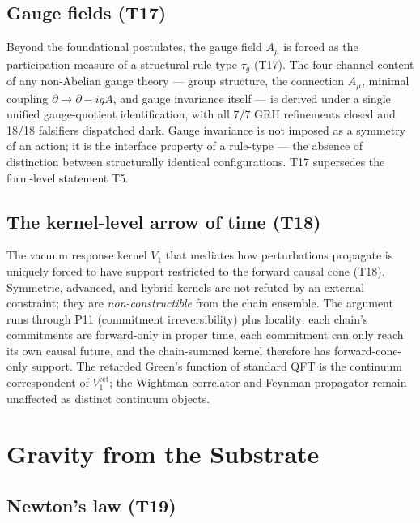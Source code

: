 \documentclass[11pt,a4paper]{article}
\begin{document}
\subsection{Gauge fields (T17)}

Beyond the foundational postulates, the gauge field $A_\mu$ is forced as the participation measure of a structural rule-type $\tau_g$ (T17). The four-channel content of any non-Abelian gauge theory --- group structure, the connection $A_\mu$, minimal coupling $\partial \to \partial - igA$, and gauge invariance itself --- is derived under a single unified gauge-quotient identification, with all 7/7 GRH refinements closed and 18/18 falsifiers dispatched dark. Gauge invariance is not imposed as a symmetry of an action; it is the interface property of a rule-type --- the absence of distinction between structurally identical configurations. T17 supersedes the form-level statement T5.

\subsection{The kernel-level arrow of time (T18)}

The vacuum response kernel $V_1$ that mediates how perturbations propagate is uniquely forced to have support restricted to the forward causal cone (T18). Symmetric, advanced, and hybrid kernels are not refuted by an external constraint; they are \emph{non-constructible} from the chain ensemble. The argument runs through P11 (commitment irreversibility) plus locality: each chain's commitments are forward-only in proper time, each commitment can only reach its own causal future, and the chain-summed kernel therefore has forward-cone-only support. The retarded Green's function of standard QFT is the continuum correspondent of $V_1^\mathrm{ret}$; the Wightman correlator and Feynman propagator remain unaffected as distinct continuum objects.

\section{Gravity from the Substrate}\label{sec:gr}

\subsection{Newton's law (T19)}
\end{document}
